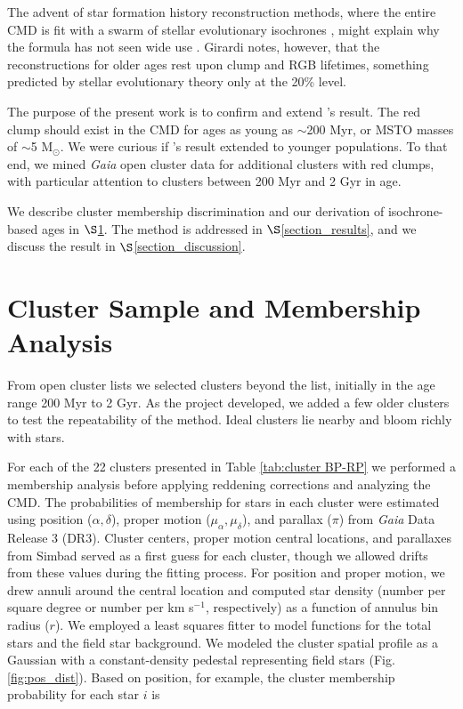\documentclass[twocolumn,times]{aastex631}
\begin{document}
The advent of star formation history reconstruction methods, where the entire CMD is fit with a swarm of stellar evolutionary isochrones \citep{2001ApJS..136...25H,2002MNRAS.332...91D}, might explain why the  formula has not seen wide use \citep{2016ARA&A..54...95G}. Girardi notes, however, that the reconstructions for older ages rest upon clump and RGB lifetimes, something predicted by stellar evolutionary theory only at the 20\% level.

The purpose of the present work is to confirm and extend 's result. The red clump should exist in the CMD for ages as young as $\sim$200 Myr, or MSTO masses of $\sim$5 M$_\odot$. We were curious if 's result extended to younger populations. To that end, we mined \textit{Gaia} open cluster data for additional clusters with red clumps, with particular attention to clusters between 200 Myr and 2 Gyr in age.

We describe cluster membership discrimination and our derivation of isochrone-based ages in $\S$\ref{section_methods}. The  method is addressed in $\S$\ref{section_results}, and we discuss the result in $\S$\ref{section_discussion}.

\section{Cluster Sample and Membership Analysis} \label{section_methods}

From open cluster lists \citep{2013A&A...558A..53K,2020A&A...640A...1C} we selected clusters beyond the  list, initially in the age range 200 Myr to 2 Gyr. As the project developed, we added a few older clusters to test the repeatability of the  method. Ideal clusters lie nearby and bloom richly with stars.

For each of the 22 clusters presented in Table \ref{tab:cluster BP-RP} we performed a membership analysis before applying reddening corrections and analyzing the CMD. The probabilities of membership for stars in each cluster were estimated using position ($\alpha , \delta$), proper motion ($\mu_\alpha , \mu_\delta$), and parallax ($\pi$) from \textit{Gaia} Data Release 3 (DR3). Cluster centers, proper motion central locations, and parallaxes from Simbad served as a first guess for each cluster, though we allowed drifts from these values during the fitting process. For position and proper motion, we drew annuli around the central location and computed star density (number per square degree or number per km s$^{-1}$, respectively) as a function of annulus bin radius ($r$). We employed a least squares fitter to model functions for the total stars and the field star background. We modeled the cluster spatial profile as a Gaussian with a constant-density pedestal representing field stars (Fig. \ref{fig:pos_dist}). Based on position, for example, the cluster membership probability for each star $i$ is 
\end{document}
